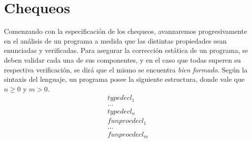 \section{Chequeos}

Comenzando con la especificación de los chequeos, avanzaremos progresivamente en el análisis de un programa a medida que las distintas propiedades sean enunciadas y verificadas.
Para asegurar la corrección estática de un programa, se deben validar cada una de sus componentes, y en el caso que todas superen su respectiva verificación, se dirá que el mismo se encuentra \textit{bien formado}.
Según la sintaxis del lenguaje, un programa posee la siguiente estructura, donde vale que $n \geq 0$ y $m > 0$.
\begin{gather*}
typedecl_1 \\
\ldots \\
typedecl_n \\
funprocdecl_1 \\
\ldots \\
funprocdecl_m
\end{gather*}
